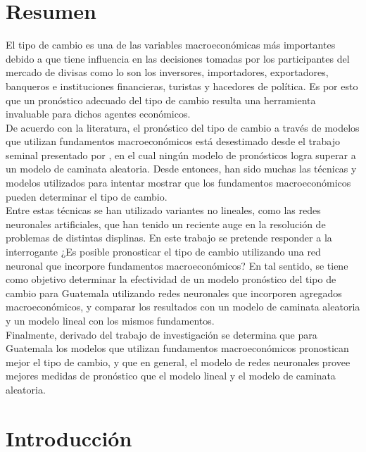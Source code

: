 \section*{Resumen}
El tipo de cambio es una de las variables macroeconómicas más importantes debido a que tiene influencia en las decisiones tomadas por los participantes del mercado de divisas como lo son los inversores, importadores, exportadores, banqueros e instituciones financieras, turistas y hacedores de política. Es por esto que un pronóstico adecuado del tipo de cambio resulta una herramienta invaluable para dichos agentes económicos.\\

De acuerdo con la literatura, el pronóstico del tipo de cambio a través de modelos que utilizan fundamentos macroeconómicos está desestimado desde el trabajo seminal presentado por \textcite{meese1983empirical}, en el cual ningún modelo de pronósticos logra superar a un modelo de caminata aleatoria. Desde entonces, han sido muchas las técnicas y modelos utilizados para intentar mostrar que los fundamentos macroeconómicos pueden determinar el tipo de cambio.\\

Entre estas técnicas se han utilizado variantes no lineales, como las redes neuronales artificiales, que han tenido un reciente auge en la resolución de problemas de distintas displinas. En este trabajo se pretende responder a la interrogante ¿Es posible pronosticar el tipo de cambio utilizando una red neuronal que incorpore fundamentos macroeconómicos? En tal sentido, se tiene como objetivo determinar la efectividad de un modelo pronóstico del tipo de cambio para Guatemala utilizando redes neuronales que incorporen agregados macroeconómicos, y comparar los resultados con un modelo de caminata aleatoria y un modelo lineal con los mismos fundamentos.\\

Finalmente, derivado del trabajo de investigación se determina que para Guatemala los modelos que utilizan fundamentos macroeconómicos pronostican mejor el tipo de cambio, y que en general, el modelo de redes neuronales provee mejores medidas de pronóstico que el modelo lineal y el modelo de caminata aleatoria.

\newpage
\section*{Introducción}

